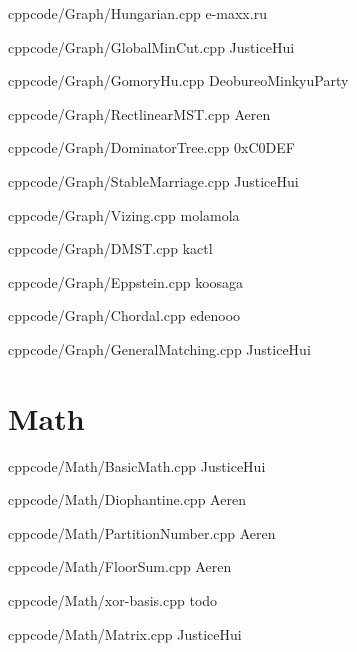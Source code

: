 \documentclass[landscape, 8pt, a4paper, oneside, twocolumn]{extarticle}
\begin{document}
{}{}
{cpp}{code/Graph/Hungarian.cpp}
{e-maxx.ru}

{}{}
{cpp}{code/Graph/GlobalMinCut.cpp}
{JusticeHui}

{}{}
{cpp}{code/Graph/GomoryHu.cpp}
{DeobureoMinkyuParty}

{}{}
{cpp}{code/Graph/RectlinearMST.cpp}
{Aeren}

{}{}
{cpp}{code/Graph/DominatorTree.cpp}
{0xC0DEF}

{}{}
{cpp}{code/Graph/StableMarriage.cpp}
{JusticeHui}

{}{}
{cpp}{code/Graph/Vizing.cpp}
{molamola}

{}{}
{cpp}{code/Graph/DMST.cpp}
{kactl}

{}{}
{cpp}{code/Graph/Eppstein.cpp}
{koosaga}

{}{}
{cpp}{code/Graph/Chordal.cpp}
{edenooo}

{}{}
{cpp}{code/Graph/GeneralMatching.cpp}
{JusticeHui}



\section{Math}

{}{}
{cpp}{code/Math/BasicMath.cpp}
{JusticeHui}

{}{}
{cpp}{code/Math/Diophantine.cpp}
{Aeren}

{}{}
{cpp}{code/Math/PartitionNumber.cpp}
{Aeren}

{}{}
{cpp}{code/Math/FloorSum.cpp}
{Aeren}

{}{}
{cpp}{code/Math/xor-basis.cpp}
{todo}

{}{}
{cpp}{code/Math/Matrix.cpp}
{JusticeHui}
\end{document}
